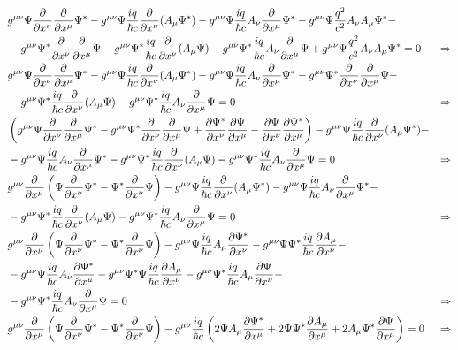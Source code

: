 \begin{align*}
  &g^{\mu\nu} \Psi \frac{\partial }{\partial x^\nu} \frac{\partial }{\partial x^\mu} \Psi^*-   g^{\mu\nu} \Psi \frac{iq}{\hbar c}\frac{\partial }{\partial x^\nu}(A_\mu\Psi^*)-g^{\mu\nu}  \Psi \frac{iq}{\hbar c} A_\nu \frac{\partial }{\partial x^\mu} \Psi^*  -g^{\mu\nu} \Psi \frac{q^2}{c^2}A_\nu A_\mu \Psi^* -
  \\& -g^{\mu\nu} \Psi^* \frac{\partial }{\partial x^\nu} \frac{\partial }{\partial x^\mu} \Psi - g^{\mu\nu} \Psi^* \frac{iq}{\hbar c}\frac{\partial }{\partial x^\nu}(A_\mu \Psi) - g^{\mu\nu}  \Psi^*  \frac{iq}{\hbar c} A_\nu \frac{\partial }{\partial x^\mu} \Psi  +g^{\mu\nu} \Psi \frac{q^2}{c^2}A_\nu A_\mu \Psi^* =0  &\Rightarrow
  \\ &g^{\mu\nu} \Psi \frac{\partial }{\partial x^\nu} \frac{\partial }{\partial x^\mu} \Psi^*-   g^{\mu\nu} \Psi \frac{iq}{\hbar c}\frac{\partial }{\partial x^\nu}(A_\mu\Psi^*)-g^{\mu\nu}  \Psi \frac{iq}{\hbar c} A_\nu \frac{\partial }{\partial x^\mu} \Psi^*-g^{\mu\nu} \Psi^* \frac{\partial }{\partial x^\nu} \frac{\partial }{\partial x^\mu} \Psi -
  \\&-g^{\mu\nu} \Psi^* \frac{iq}{\hbar c}\frac{\partial }{\partial x^\nu}(A_\mu \Psi) - g^{\mu\nu}  \Psi^*  \frac{iq}{\hbar c} A_\nu \frac{\partial }{\partial x^\mu} \Psi =0  &\Rightarrow 
  \\ &\left(  g^{\mu\nu} \Psi \frac{\partial }{\partial x^\nu} \frac{\partial }{\partial x^\mu} \Psi^*-g^{\mu\nu} \Psi^* \frac{\partial }{\partial x^\nu} \frac{\partial }{\partial x^\mu} \Psi+ \frac{\partial \Psi^*}{\partial x^\nu} \frac{\partial \Psi}{\partial x^\mu}-\frac{\partial \Psi}{\partial x^\nu} \frac{\partial \Psi^*}{\partial x^\mu} \right)  -   g^{\mu\nu} \Psi \frac{iq}{\hbar c}\frac{\partial }{\partial x^\nu}(A_\mu\Psi^*)-
  \\&-g^{\mu\nu}  \Psi \frac{iq}{\hbar c} A_\nu \frac{\partial }{\partial x^\mu} \Psi^* -g^{\mu\nu} \Psi^* \frac{iq}{\hbar c}\frac{\partial }{\partial x^\nu}(A_\mu \Psi) - g^{\mu\nu}  \Psi^*  \frac{iq}{\hbar c} A_\nu \frac{\partial }{\partial x^\mu} \Psi =0  &\Rightarrow 
  \\ &g^{\mu\nu} \frac{\partial }{\partial x^\mu} \left(    \Psi\frac{\partial }{\partial x^\nu}\Psi^*  - \Psi^* \frac{\partial }{\partial x^\nu} \Psi \right)  - g^{\mu\nu} \Psi \frac{iq}{\hbar c}\frac{\partial }{\partial x^\nu}(A_\mu\Psi^*)-g^{\mu\nu}  \Psi \frac{iq}{\hbar c} A_\nu \frac{\partial }{\partial x^\mu} \Psi^*-
  \\& -g^{\mu\nu} \Psi^* \frac{iq}{\hbar c}\frac{\partial }{\partial x^\nu}(A_\mu \Psi) - g^{\mu\nu}  \Psi^*  \frac{iq}{\hbar c} A_\nu \frac{\partial }{\partial x^\mu} \Psi =0  &\Rightarrow 
  \\ &g^{\mu\nu} \frac{\partial }{\partial x^\mu} \left(    \Psi\frac{\partial }{\partial x^\nu}\Psi^*  - \Psi^* \frac{\partial }{\partial x^\nu} \Psi \right)  - g^{\mu\nu} \Psi \frac{iq}{\hbar c} A_\mu\frac{\partial \Psi^*}{\partial x^\nu}- g^{\mu\nu} \Psi \Psi^* \frac{iq}{\hbar c}\frac{\partial A_\mu}{\partial x^\nu}-
 \\&-g^{\mu\nu}\Psi \frac{iq}{\hbar c} A_\nu \frac{\partial \Psi^*}{\partial x^\mu} -g^{\mu\nu} \Psi^*  \Psi\frac{iq}{\hbar c}\frac{\partial A_\mu}{\partial x^\nu}-g^{\mu\nu} \Psi^* \frac{iq}{\hbar c}A_\mu\frac{\partial \Psi}{\partial x^\nu}- 
  \\&-g^{\mu\nu}  \Psi^*  \frac{iq}{\hbar c} A_\nu \frac{\partial }{\partial x^\mu} \Psi =0  &\Rightarrow
  \\ &g^{\mu\nu} \frac{\partial }{\partial x^\mu} \left(    \Psi\frac{\partial }{\partial x^\nu}\Psi^*  - \Psi^* \frac{\partial }{\partial x^\nu} \Psi \right)  - g^{\mu\nu} \frac{iq}{\hbar c} \left(  2\Psi A_\mu\frac{\partial \Psi^*}{\partial x^\mu} +2\Psi \Psi^* \frac{\partial A_\mu}{\partial x^\mu}+ 2 A_\mu \Psi^* \frac{\partial \Psi}{\partial x^\mu} \right) =0 &\Rightarrow
\end{align*}

